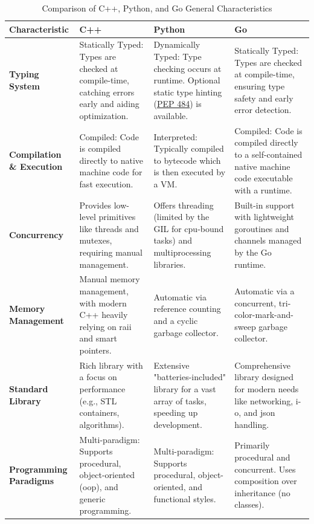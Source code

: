 \begin{table}
	\centering
	\caption{Comparison of C++, Python, and Go General Characteristics}
	\label{tab:language_comparison}
	\begin{tabularx}{\textwidth}{
		>{\raggedright\arraybackslash}p{}
		>{\raggedright\arraybackslash}X
		>{\raggedright\arraybackslash}X
		>{\raggedright\arraybackslash}X
	}
		\toprule
		\textbf{Characteristic} & \textbf{C++} & \textbf{Python} & \textbf{Go} \\
		\midrule
		
		\textbf{Typing System} &
		Statically Typed: Types are checked at compile-time, catching errors early and aiding optimization. &
		Dynamically Typed: Type checking occurs at runtime. Optional static type hinting (\href{https://peps.python.org/pep-0484/}{PEP 484}) is available. &
		Statically Typed: Types are checked at compile-time, ensuring type safety and early error detection. \\
		\addlinespace
		
		\textbf{Compilation \& Execution} &
		Compiled: Code is compiled directly to native machine code for fast execution. &
		Interpreted: Typically compiled to \gls{bytecode} which is then executed by a \gls{VM}. &
		Compiled: Code is compiled directly to a self-contained native machine code executable with a runtime. \\
		\addlinespace
		
		\textbf{Concurrency} &
		Provides low-level primitives like threads and \gls{mutex}es, requiring manual management. &
		Offers threading (limited by the \gls{GIL} for \gls{cpu}-bound tasks) and multiprocessing libraries. &
		Built-in support with lightweight \glspl{goroutine} and \glspl{channel} managed by the Go runtime. \\
		\addlinespace
		
		\textbf{Memory Management} &
		Manual memory management, with modern C++ heavily relying on \gls{raii} and smart pointers. &
		Automatic via reference counting and a cyclic garbage collector. &
		Automatic via a concurrent, \gls{tri-color-mark-and-sweep} garbage collector. \\
		\addlinespace
		
		\textbf{Standard Library} &
		Rich library with a focus on performance (e.g., STL containers, algorithms). &
		Extensive "batteries-included" library for a vast array of tasks, speeding up development. &
		Comprehensive library designed for modern needs like networking, \gls{i-o}, and \gls{json} handling. \\
		\addlinespace
		
		\textbf{Programming Paradigms} &
		Multi-paradigm: Supports procedural, object-oriented (\gls{oop}), and generic programming. &
		Multi-paradigm: Supports procedural, object-oriented, and functional styles. &
		Primarily procedural and concurrent. Uses composition over inheritance (no classes). \\
		\bottomrule
	\end{tabularx}
\end{table}


